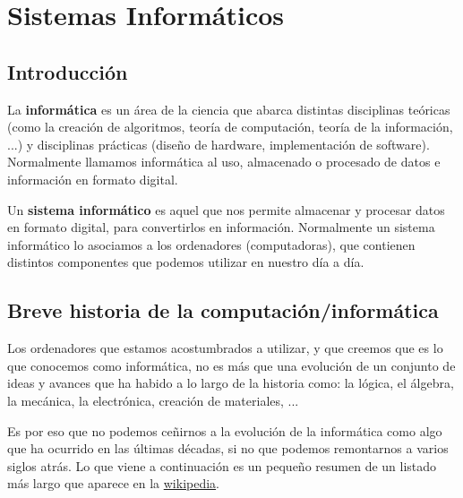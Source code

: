 \chapter{Sistemas Informáticos}

\section{Introducción}

La \textbf{informática} es un área de la ciencia que abarca distintas disciplinas teóricas (como la creación de algoritmos, teoría de computación, teoría de la información, ...) y disciplinas prácticas (diseño de hardware, implementación de software). Normalmente llamamos informática al uso, almacenado o procesado de datos e información en formato digital.

Un \textbf{sistema informático} es aquel que nos permite almacenar y procesar datos en formato digital, para convertirlos en información. Normalmente un sistema informático lo asociamos a los ordenadores (computadoras), que contienen distintos componentes que podemos utilizar en nuestro día a día.

\section{Breve historia de la computación/informática}

Los ordenadores que estamos acostumbrados a utilizar, y que creemos que es lo que conocemos como informática, no es más que una evolución de un conjunto de ideas y avances que ha habido a lo largo de la historia como: la lógica, el álgebra, la mecánica, la electrónica, creación de materiales, ...

Es por eso que no podemos ceñirnos a la evolución de la informática como algo que ha ocurrido en las últimas décadas, si no que podemos remontarnos a varios siglos atrás. Lo que viene a continuación es un pequeño resumen de un listado más largo que aparece en la \href{https://es.wikipedia.org/wiki/Anexo:Historia_de_la_computaci%C3%B3n}{wikipedia}.

